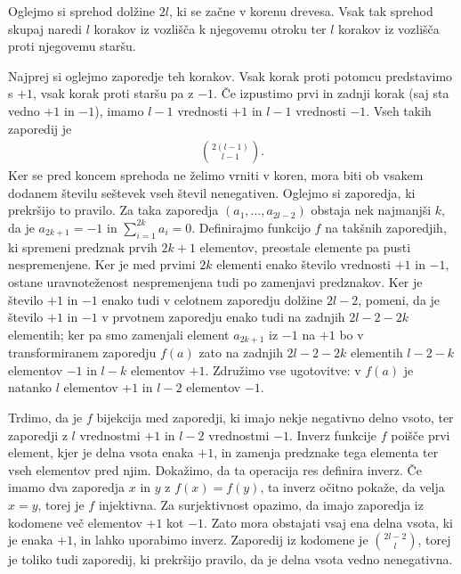 \begin{dokaz}
    Oglejmo si sprehod dolžine \(2l\), ki se začne v korenu drevesa. Vsak tak sprehod skupaj naredi \(l\) korakov iz vozlišča k njegovemu otroku ter \(l\) korakov iz vozlišča proti njegovemu staršu. 
    
    Najprej si oglejmo zaporedje teh korakov. Vsak korak proti potomcu predstavimo s \(+1\), vsak korak proti staršu pa z \(-1\). Če izpustimo prvi in zadnji korak (saj sta vedno \(+1\) in \(-1\)), imamo \(l-1\) vrednosti \(+1\) in \(l-1\) vrednosti \(-1\). Vseh takih zaporedij je
    \begin{align*}
        \binom{2(l-1)}{l-1}.
    \end{align*}
    Ker se pred koncem sprehoda ne želimo vrniti v koren, mora biti ob vsakem dodanem številu seštevek vseh števil nenegativen. Oglejmo si zaporedja, ki prekršijo to pravilo. Za taka zaporedja \((a_1, \ldots, a_{2l-2})\) obstaja nek najmanjši \(k\), da je \(a_{2k+1}=-1\) in \(\sum_{i=1}^{2k} a_i = 0\). Definirajmo funkcijo \(f\) na takšnih zaporedjih, ki spremeni predznak prvih \(2k+1\) elementov, preostale elemente pa pusti nespremenjene. Ker je med prvimi \(2k\) elementi enako število vrednosti \(+1\) in \(-1\), ostane uravnoteženost nespremenjena tudi po zamenjavi predznakov. Ker je število \(+1\) in \(-1\) enako tudi v celotnem zaporedju dolžine \(2l-2\), pomeni, da je število \(+1\) in \(-1\) v prvotnem zaporedju enako tudi na zadnjih \(2l-2-2k\) elementih; ker pa smo zamenjali element \(a_{2k+1}\) iz \(-1\) na \(+1\) bo v transformiranem zaporedju \(f(a)\) zato na zadnjih \(2l-2-2k\) elementih \(l-2-k\) elementov \(-1\) in \(l-k\) elementov \(+1\). Združimo vse ugotovitve: v \(f(a)\) je natanko \(l\) elementov \(+1\) in \(l-2\) elementov \(-1\). 
    
    Trdimo, da je \(f\) bijekcija med zaporedji, ki imajo nekje negativno delno vsoto, ter zaporedji z \(l\) vrednostmi \(+1\) in \(l-2\) vrednostmi \(-1\). Inverz funkcije \(f\) poišče prvi element, kjer je delna vsota enaka \(+1\), in zamenja predznake tega elementa ter vseh elementov pred njim. Dokažimo, da ta operacija res definira inverz. Če imamo dva zaporedja \(x\) in \(y\) z \(f(x)=f(y)\), ta inverz očitno pokaže, da velja \(x=y\), torej je \(f\) injektivna. Za surjektivnost opazimo, da imajo zaporedja iz kodomene več elementov \(+1\) kot \(-1\). Zato mora obstajati vsaj ena delna vsota, ki je enaka \(+1\), in lahko uporabimo inverz. Zaporedij iz kodomene je \(\binom{2l-2}{l}\), torej je toliko tudi zaporedij, ki prekršijo pravilo, da je delna vsota vedno nenegativna.
    

\end{dokaz}

